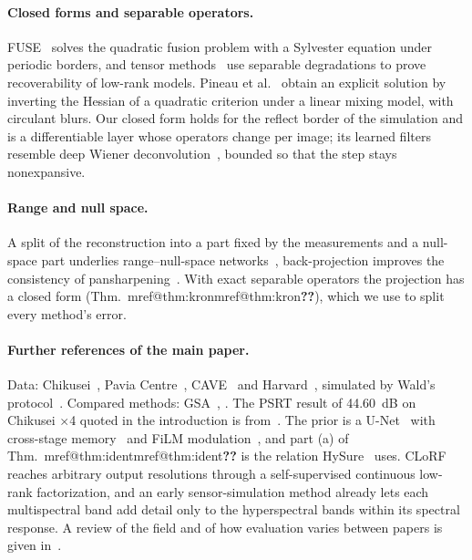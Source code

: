 \documentclass[10pt,twocolumn,letterpaper]{article}
\makeatletter
\newcommand{\mref}[1]{\ifcsname mref@#1\endcsname\csname mref@#1\endcsname\else\textbf{??}\fi}
\makeatother
\begin{document}
\paragraph{Closed forms and separable operators.} FUSE~\cite{wei2015fuse} solves the quadratic fusion problem with a Sylvester equation under periodic borders, and tensor methods~\cite{li2018cstf,kanatsoulis2018stereo,prevost2020scott} use separable degradations to prove recoverability of low-rank models. Pineau et al.~\cite{pineau2023exact} obtain an explicit solution by inverting the Hessian of a quadratic criterion under a linear mixing model, with circulant blurs. Our closed form holds for the reflect border of the simulation and is a differentiable layer whose operators change per image; its learned filters resemble deep Wiener deconvolution~\cite{dong2020wiener}, bounded so that the step stays nonexpansive.

\paragraph{Range and null space.} A split of the reconstruction into a part fixed by the measurements and a null-space part underlies range--null-space networks~\cite{chen2020decomposition}, back-projection improves the consistency of pansharpening~\cite{vicinanza2014consistency}. With exact separable operators the projection has a closed form (Thm.~\mref{thm:kron}), which we use to split every method's error.

\paragraph{Further references of the main paper.} Data: Chikusei~\cite{yokoya2016chikusei}, Pavia Centre~\cite{gamba2004pavia}, CAVE~\cite{yasuma2010cave} and Harvard~\cite{chakrabarti2011harvard}, simulated by Wald's protocol~\cite{vivone2015critical}. Compared methods: GSA~\cite{aiazzi2007gsa}, . The PSRT result of 44.60~dB on Chikusei $\times$4 quoted in the introduction is from~\cite{pei2026s3o}. The prior is a U-Net~\cite{ronneberger2015unet} with cross-stage memory~\cite{song2021madun} and FiLM modulation~\cite{perez2018film}, and part (a) of Thm.~\mref{thm:ident} is the relation HySure~\cite{simoes2015hysure} uses. CLoRF~\cite{wang2025clorf} reaches arbitrary output resolutions through a self-supervised continuous low-rank factorization, and an early sensor-simulation method \cite{khandelwal2011hyssvd} already lets each multispectral band add detail only to the hyperspectral bands within its spectral response. A review of the field and of how evaluation varies between papers is given in~\cite{vivone2025deep}.
\end{document}
